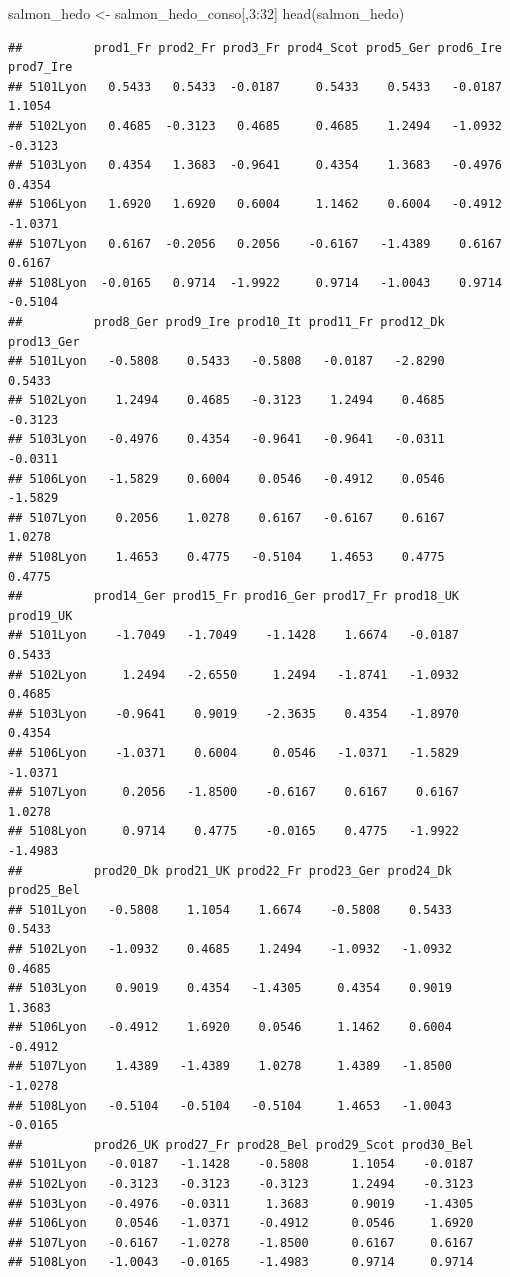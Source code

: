 \documentclass[
]{book}
\newenvironment{Shaded}{\begin{snugshade}}{\end{snugshade}}
\newcommand{\DecValTok}[1]{\textcolor[rgb]{0.00,0.00,0.81}{#1}}
\newcommand{\FunctionTok}[1]{\textcolor[rgb]{0.00,0.00,0.00}{#1}}
\newcommand{\NormalTok}[1]{#1}
\newcommand{\OtherTok}[1]{\textcolor[rgb]{0.56,0.35,0.01}{#1}}
\newcommand{\SpecialCharTok}[1]{\textcolor[rgb]{0.00,0.00,0.00}{#1}}
\begin{document}
\begin{Shaded}
\begin{Highlighting}[]
\NormalTok{salmon\_hedo }\OtherTok{\textless{}{-}}\NormalTok{ salmon\_hedo\_conso[,}\DecValTok{3}\SpecialCharTok{:}\DecValTok{32}\NormalTok{]}
\FunctionTok{head}\NormalTok{(salmon\_hedo)}
\end{Highlighting}
\end{Shaded}

\begin{verbatim}
##          prod1_Fr prod2_Fr prod3_Fr prod4_Scot prod5_Ger prod6_Ire prod7_Ire
## 5101Lyon   0.5433   0.5433  -0.0187     0.5433    0.5433   -0.0187    1.1054
## 5102Lyon   0.4685  -0.3123   0.4685     0.4685    1.2494   -1.0932   -0.3123
## 5103Lyon   0.4354   1.3683  -0.9641     0.4354    1.3683   -0.4976    0.4354
## 5106Lyon   1.6920   1.6920   0.6004     1.1462    0.6004   -0.4912   -1.0371
## 5107Lyon   0.6167  -0.2056   0.2056    -0.6167   -1.4389    0.6167    0.6167
## 5108Lyon  -0.0165   0.9714  -1.9922     0.9714   -1.0043    0.9714   -0.5104
##          prod8_Ger prod9_Ire prod10_It prod11_Fr prod12_Dk prod13_Ger
## 5101Lyon   -0.5808    0.5433   -0.5808   -0.0187   -2.8290     0.5433
## 5102Lyon    1.2494    0.4685   -0.3123    1.2494    0.4685    -0.3123
## 5103Lyon   -0.4976    0.4354   -0.9641   -0.9641   -0.0311    -0.0311
## 5106Lyon   -1.5829    0.6004    0.0546   -0.4912    0.0546    -1.5829
## 5107Lyon    0.2056    1.0278    0.6167   -0.6167    0.6167     1.0278
## 5108Lyon    1.4653    0.4775   -0.5104    1.4653    0.4775     0.4775
##          prod14_Ger prod15_Fr prod16_Ger prod17_Fr prod18_UK prod19_UK
## 5101Lyon    -1.7049   -1.7049    -1.1428    1.6674   -0.0187    0.5433
## 5102Lyon     1.2494   -2.6550     1.2494   -1.8741   -1.0932    0.4685
## 5103Lyon    -0.9641    0.9019    -2.3635    0.4354   -1.8970    0.4354
## 5106Lyon    -1.0371    0.6004     0.0546   -1.0371   -1.5829   -1.0371
## 5107Lyon     0.2056   -1.8500    -0.6167    0.6167    0.6167    1.0278
## 5108Lyon     0.9714    0.4775    -0.0165    0.4775   -1.9922   -1.4983
##          prod20_Dk prod21_UK prod22_Fr prod23_Ger prod24_Dk prod25_Bel
## 5101Lyon   -0.5808    1.1054    1.6674    -0.5808    0.5433     0.5433
## 5102Lyon   -1.0932    0.4685    1.2494    -1.0932   -1.0932     0.4685
## 5103Lyon    0.9019    0.4354   -1.4305     0.4354    0.9019     1.3683
## 5106Lyon   -0.4912    1.6920    0.0546     1.1462    0.6004    -0.4912
## 5107Lyon    1.4389   -1.4389    1.0278     1.4389   -1.8500    -1.0278
## 5108Lyon   -0.5104   -0.5104   -0.5104     1.4653   -1.0043    -0.0165
##          prod26_UK prod27_Fr prod28_Bel prod29_Scot prod30_Bel
## 5101Lyon   -0.0187   -1.1428    -0.5808      1.1054    -0.0187
## 5102Lyon   -0.3123   -0.3123    -0.3123      1.2494    -0.3123
## 5103Lyon   -0.4976   -0.0311     1.3683      0.9019    -1.4305
## 5106Lyon    0.0546   -1.0371    -0.4912      0.0546     1.6920
## 5107Lyon   -0.6167   -1.0278    -1.8500      0.6167     0.6167
## 5108Lyon   -1.0043   -0.0165    -1.4983      0.9714     0.9714
\end{verbatim}
\end{document}
